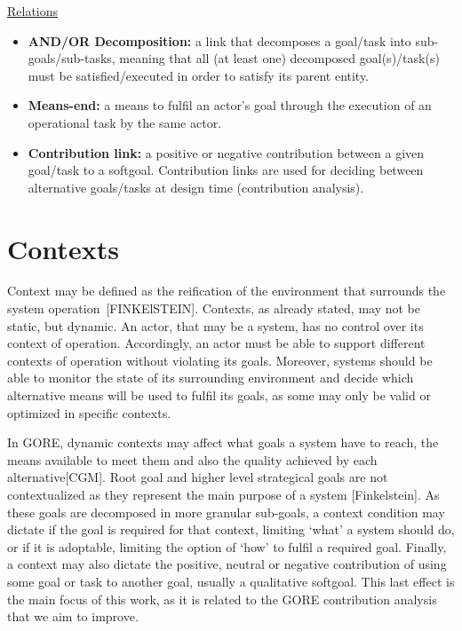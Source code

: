\large{\underline{Relations}}

\begin{itemize}

\item \textbf{AND/OR Decomposition:} a link that decomposes a goal/task into sub-goals/sub-tasks, meaning that all (at least one) decomposed goal(s)/task(s) must be satisfied/executed in order to satisfy its parent entity. 
\medskip

\item \textbf{Means-end:} a means to fulfil an actor's goal through the execution of an operational task by the same actor.
\medskip

\item \textbf{Contribution link:} a positive or negative contribution between a given goal/task to a softgoal. Contribution links are used for deciding between alternative goals/tasks at design time (contribution analysis).

\end{itemize}

\section{Contexts}

Context may be defined as the reification of the environment that surrounds the system operation~[FINKElSTEIN]. Contexts, as already stated, may not be static, but dynamic. An actor, that may be a system, has no control over its context of operation. Accordingly, an actor must be able to support different contexts of operation without violating its goals. Moreover, systems should be able to monitor the state of its surrounding environment and decide which alternative means will be used to fulfil its goals, as some may only be valid or optimized in specific contexts.

In GORE, dynamic contexts may affect what goals a system have to reach, the means available to meet them and also the quality achieved by each alternative[CGM]. Root goal and higher level strategical goals are not contextualized as they represent the main purpose of a system [Finkelstein]. As these goals are decomposed in more granular sub-goals, a context condition may dictate if the goal is required for that context, limiting `what' a system should do, or if it is adoptable, limiting the option of `how' to fulfil a required goal. Finally, a context may also dictate the positive, neutral or negative contribution of using some goal or task to another goal, usually a qualitative softgoal. This last effect is the main focus of this work, as it is related to the GORE contribution analysis that we aim to improve.
 


